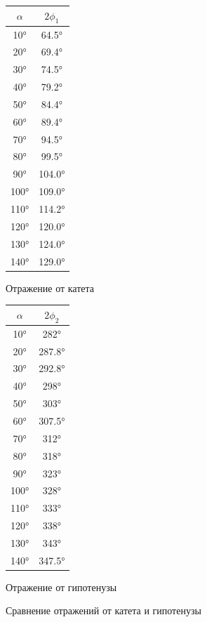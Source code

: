 \documentclass[a4paper]{article}
\begin{document}
\begin{figure}[!h]
\centering
\caption{Сравнение отражений от катета и гипотенузы}

\begin{minipage}[!h]{0.45\textwidth}
\centering
\begin{tabular}{|c|c|}
\hline
$\alpha$ & $2 \phi_1$ \\
\hline
10°  &  64.5° \\
20°  &  69.4° \\
30°  &  74.5° \\
40°  &  79.2° \\
50°  &  84.4° \\
60°  &  89.4° \\
70°  &  94.5° \\
80°  &  99.5° \\
90°  & 104.0° \\
100° & 109.0° \\
110° & 114.2° \\
120° & 120.0° \\
130° & 124.0° \\
140° & 129.0° \\
\hline
\end{tabular}

\vspace{0.5em}
Отражение от катета
\end{minipage}
\hfill
\begin{minipage}{0.45\textwidth}
\centering
\begin{tabular}{|c|c|}
\hline
$\alpha$ & $2 \phi_2$ \\
\hline
10°  & 282°   \\
20°  & 287.8° \\
30°  & 292.8° \\
40°  & 298°   \\
50°  & 303°   \\
60°  & 307.5° \\
70°  & 312°   \\
80°  & 318°   \\
90°  & 323°   \\
100° & 328°   \\
110° & 333°   \\
120° & 338°   \\
130° & 343°   \\
140° & 347.5° \\
\hline
\end{tabular}

\vspace{0.5em}
Отражение от гипотенузы
\end{minipage}

\end{figure}
\end{document}
